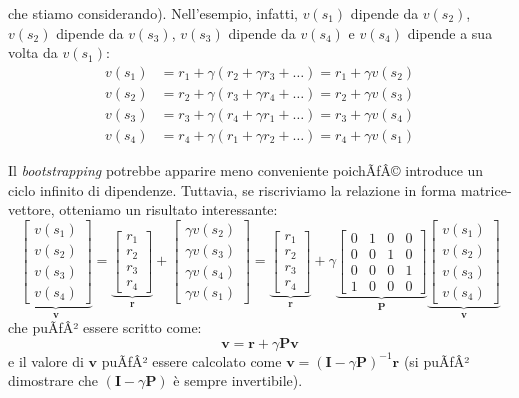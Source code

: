 ﻿\documentclass[11pt, a4paper]{report}
\begin{document}
\newpage

che stiamo considerando). Nell'esempio, infatti, $v(s_1)$ dipende da $v(s_2)$, $v(s_2)$ dipende da $v(s_3)$, $v(s_3)$ dipende da $v(s_4)$ e $v(s_4)$ dipende a sua volta da $v(s_1)$:
\begin{equation}
\begin{aligned}
v(s_1) &= r_1 + \gamma(r_2 + \gamma r_3 + \dots) = r_1 + \gamma v(s_2) \\
v(s_2) &= r_2 + \gamma(r_3 + \gamma r_4 + \dots) = r_2 + \gamma v(s_3) \\
v(s_3) &= r_3 + \gamma(r_4 + \gamma r_1 + \dots) = r_3 + \gamma v(s_4) \\
v(s_4) &= r_4 + \gamma(r_1 + \gamma r_2 + \dots) = r_4 + \gamma v(s_1)
\end{aligned}
\end{equation}

Il \emph{bootstrapping} potrebbe apparire meno conveniente poichÃƒÂ© introduce un ciclo infinito di dipendenze. Tuttavia, se riscriviamo la relazione in forma matrice-vettore, otteniamo un risultato interessante:
\begin{equation}
\underbrace{\begin{bmatrix}
v(s_1) \\
v(s_2) \\
v(s_3) \\
v(s_4)
\end{bmatrix}}_{\bm{v}}
=
\underbrace{\begin{bmatrix}
r_1 \\
r_2 \\
r_3 \\
r_4
\end{bmatrix}}_{\bm{r}}
+
\begin{bmatrix}
\gamma v(s_2) \\
\gamma v(s_3) \\
\gamma v(s_4) \\
\gamma v(s_1)
\end{bmatrix}
=
\underbrace{\begin{bmatrix}
r_1 \\
r_2 \\
r_3 \\
r_4
\end{bmatrix}}_{\bm{r}}
+ \gamma
\underbrace{\begin{bmatrix}
0 & 1 & 0 & 0 \\
0 & 0 & 1 & 0 \\
0 & 0 & 0 & 1 \\
1 & 0 & 0 & 0
\end{bmatrix}}_{\bm{P}}
\underbrace{\begin{bmatrix}
v(s_1) \\
v(s_2) \\
v(s_3) \\
v(s_4)
\end{bmatrix}}_{\bm{v}}
\end{equation}
che puÃƒÂ² essere scritto come:
\begin{equation}
\bm{v} = \bm{r} + \gamma \bm{P}\bm{v}
\end{equation}
e il valore di $\bm{v}$ puÃƒÂ² essere calcolato come $\bm{v} = (\bm{I} - \gamma \bm{P})^{-1} \bm{r}$ (si puÃƒÂ² dimostrare che $(\bm{I} - \gamma \bm{P})$ è sempre invertibile).
\end{document}
